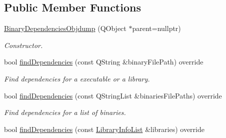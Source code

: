 \subsection*{Public Member Functions}
\begin{DoxyCompactItemize}
\item 
\hyperlink{class_mdt_1_1_deploy_utils_1_1_binary_dependencies_objdump_a3bb8d6f31156903ae1b279b3dd6e87b8}{Binary\+Dependencies\+Objdump} (Q\+Object $\ast$parent=nullptr)\hypertarget{class_mdt_1_1_deploy_utils_1_1_binary_dependencies_objdump_a3bb8d6f31156903ae1b279b3dd6e87b8}{}\label{class_mdt_1_1_deploy_utils_1_1_binary_dependencies_objdump_a3bb8d6f31156903ae1b279b3dd6e87b8}

\begin{DoxyCompactList}\small\item\em Constructor. \end{DoxyCompactList}\item 
bool \hyperlink{class_mdt_1_1_deploy_utils_1_1_binary_dependencies_objdump_ad17be25ef296988d6255faa5c1dd573d}{find\+Dependencies} (const Q\+String \&binary\+File\+Path) override\hypertarget{class_mdt_1_1_deploy_utils_1_1_binary_dependencies_objdump_ad17be25ef296988d6255faa5c1dd573d}{}\label{class_mdt_1_1_deploy_utils_1_1_binary_dependencies_objdump_ad17be25ef296988d6255faa5c1dd573d}

\begin{DoxyCompactList}\small\item\em Find dependencies for a executable or a library. \end{DoxyCompactList}\item 
bool \hyperlink{class_mdt_1_1_deploy_utils_1_1_binary_dependencies_objdump_acaa13006ae7478fa5555f0d7356ae9d2}{find\+Dependencies} (const Q\+String\+List \&binaries\+File\+Paths) override\hypertarget{class_mdt_1_1_deploy_utils_1_1_binary_dependencies_objdump_acaa13006ae7478fa5555f0d7356ae9d2}{}\label{class_mdt_1_1_deploy_utils_1_1_binary_dependencies_objdump_acaa13006ae7478fa5555f0d7356ae9d2}

\begin{DoxyCompactList}\small\item\em Find dependencies for a list of binaries. \end{DoxyCompactList}\item 
bool \hyperlink{class_mdt_1_1_deploy_utils_1_1_binary_dependencies_objdump_ae26f2210f17cca66ba313751ae08e412}{find\+Dependencies} (const \hyperlink{class_mdt_1_1_deploy_utils_1_1_library_info_list}{Library\+Info\+List} \&libraries) override\hypertarget{class_mdt_1_1_deploy_utils_1_1_binary_dependencies_objdump_ae26f2210f17cca66ba313751ae08e412}{}\label{class_mdt_1_1_deploy_utils_1_1_binary_dependencies_objdump_ae26f2210f17cca66ba313751ae08e412}


\end{DoxyCompactItemize}
